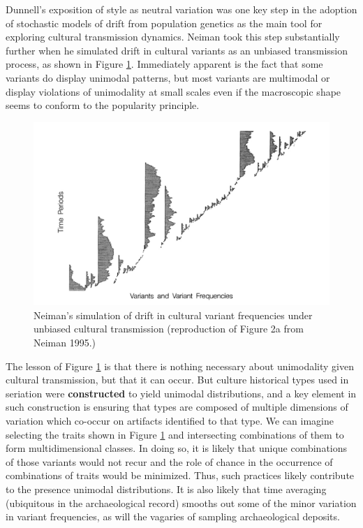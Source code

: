 \documentclass[graybox,natbib]{svmult}
\begin{document}
Dunnell's \citeyearpar{Dunnell1978} exposition of style as neutral
variation was one key step in the adoption of stochastic models of drift
from population genetics as the main tool for exploring cultural
transmission dynamics. Neiman \citeyearpar{Neiman1995} took this step
substantially further when he simulated drift in cultural variants as an
unbiased transmission process, as shown in Figure \ref{img:neiman-fig2}.
Immediately apparent is the fact that some variants do display unimodal
patterns, but most variants are multimodal or display violations of
unimodality at small scales even if the macroscopic shape seems to
conform to the popularity principle.

\begin{figure}[ht]
\centering
\includegraphics[scale=0.6]{neiman-1995-figure2a.pdf}
\caption{Neiman's simulation of drift in cultural variant frequencies under unbiased cultural transmission (reproduction of Figure 2a from Neiman 1995.)}
\label{img:neiman-fig2}
\end{figure}

The lesson of Figure \ref{img:neiman-fig2} is that there is nothing
necessary about unimodality given cultural transmission, but that it can
occur. But culture historical types used in seriation were
\textbf{constructed} to yield unimodal distributions, and a key element
in such construction is ensuring that types are composed of multiple
dimensions of variation which co-occur on artifacts identified to that
type. We can imagine selecting the traits shown in Figure
\ref{img:neiman-fig2} and intersecting combinations of them to form
multidimensional classes. In doing so, it is likely that unique
combinations of those variants would not recur and the role of chance in
the occurrence of combinations of traits would be minimized. Thus, such
practices likely contribute to the presence unimodal distributions. It
is also likely that time averaging (ubiquitous in the archaeological
record) smooths out some of the minor variation in variant frequencies,
as will the vagaries of sampling archaeological deposits.
\end{document}
